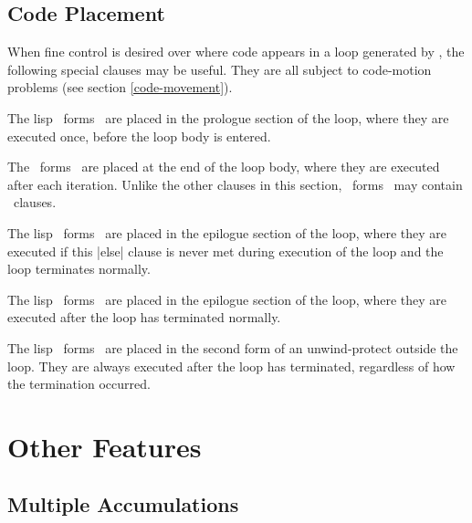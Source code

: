 \subsection{Code Placement}
When fine control is desired over where code appears in a loop
generated by \iter, the following special clauses may be useful.
They are all subject to code-motion problems (see section
\ref{code-movement}).  

\begin{clauses}

The lisp ~forms~ are placed in the prologue section of the loop, where
they are executed once, before the loop body is entered.

The ~forms~ are placed at the end of the loop body, where they
are executed after each iteration.  Unlike the other clauses in this
section, ~forms~ may contain \iter\ clauses.

The lisp ~forms~ are placed in the epilogue section of the loop, where they
are executed if this |else| clause is never met during execution of the
loop and the loop terminates normally.

The lisp ~forms~ are placed in the epilogue section of the loop, where
they are executed after the loop has terminated normally.

The lisp ~forms~ are placed in the second form of an unwind-protect
outside the loop.  They are always executed after the loop has
terminated, regardless of how the termination occurred.

\end{clauses}


\section{Other Features}

\subsection{Multiple Accumulations}
\label{multiple}

